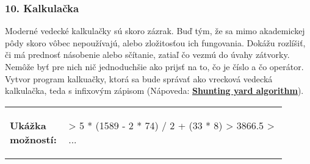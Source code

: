 \subsubsection*{10. Kalkulačka}
Moderné vedecké kalkulačky sú skoro zázrak. Buď tým, že sa mimo akademickej pôdy skoro vôbec nepoužívajú, alebo zložitosťou ich fungovania. Dokážu rozlíšiť, či má prednosť násobenie alebo sčítanie, zatiaľ čo vezmú do úvahy zátvorky. Nemôže byť pre nich nič jednoduchšie ako prijsť na to, čo je číslo a čo operátor. Vytvor program kalkuačky, ktorá sa bude správať ako vrecková vedecká kalkulačka, teda s infixovým zápisom (Nápoveda: \underline{\textbf{Shunting yard algorithm}}).

\begin{tabular}{@{}p{0.15\linewidth}p{0.75\linewidth}}
\textbf{\small Ukážka možností:} &
\vspace{-3em}
\begin{code}
> 5 * (1589 - 2 * 74) / 2 + (33 * 8)
> 3866.5
> ...
\end{code}
\end{tabular}
\vspace{-2em}
